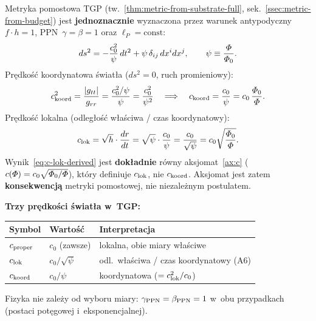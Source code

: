 \begin{proposition}\label{prop:c-from-metric}
Metryka pomostowa TGP (tw.~\ref{thm:metric-from-substrate-full},
sek.~\ref{ssec:metric-from-budget}) jest \textbf{jednoznacznie}
wyznaczona przez warunek antypodyczny $f \cdot h = 1$,
PPN~$\gamma = \beta = 1$ oraz $\ell_P = \text{const}$:
\begin{equation}\label{eq:metric-bridge-c}
  ds^2 = -\frac{c_0^2}{\psi}\,dt^2
         + \psi\,\delta_{ij}\,dx^i dx^j,
  \qquad \psi \equiv \frac{\varPhi}{\varPhi_0}.
\end{equation}
Pr\k{e}dko\'s\'c koordynatowa \'swiat\l{}a ($ds^2 = 0$, ruch promieniowy):
\begin{equation}\label{eq:c-from-metric-deriv}
  c_{\rm koord}^2 = \frac{|g_{tt}|}{g_{rr}}
  = \frac{c_0^2/\psi}{\psi}
  = \frac{c_0^2}{\psi^2}
  \quad\Longrightarrow\quad
  c_{\rm koord} = \frac{c_0}{\psi}
  = c_0\,\frac{\varPhi_0}{\varPhi}.
\end{equation}
Pr\k{e}dko\'s\'c lokalna (odleg\l{}o\'s\'c w\l{}a\'sciwa / czas koordynatowy):
\begin{equation}\label{eq:c-lok-derived}
  c_{\rm lok} = \sqrt{h}\cdot\frac{dr}{dt}
  = \sqrt{\psi}\cdot\frac{c_0}{\psi}
  = \frac{c_0}{\sqrt{\psi}}
  = c_0\sqrt{\frac{\varPhi_0}{\varPhi}}.
\end{equation}
Wynik~\eqref{eq:c-lok-derived} jest \textbf{dok\l{}adnie} r\'owny
aksjomat~\ref{ax:c} ($c(\varPhi) = c_0\sqrt{\varPhi_0/\varPhi}$),
kt\'ory definiuje $c_{\rm lok}$, nie $c_{\rm koord}$.
Aksjomat jest zatem \textbf{konsekwencj\k{a}} metryki pomostowej,
nie niezale\.znym postulatem.

\medskip\noindent
\textbf{Trzy pr\k{e}dko\'sci \'swiat\l{}a w~TGP:}
\begin{center}\small
\begin{tabular}{@{}lll@{}}
\toprule
\textbf{Symbol} & \textbf{Warto\'s\'c} & \textbf{Interpretacja} \\
\midrule
$c_{\rm proper}$ & $c_0$ (zawsze)
  & lokalna, obie miary w\l{}a\'sciwe \\
$c_{\rm lok}$ & $c_0/\sqrt{\psi}$
  & odl.~w\l{}a\'sciwa / czas koordynatowy (A6) \\
$c_{\rm koord}$ & $c_0/\psi$
  & koordynatowa ($= c_{\rm lok}^2/c_0$) \\
\bottomrule
\end{tabular}
\end{center}
\noindent
Fizyka nie zale\.zy od wyboru miary: $\gamma_{\rm PPN} = \beta_{\rm PPN} = 1$
w~obu przypadkach (postaci pot\k{e}gowej i~eksponencjalnej).


\end{proposition}
